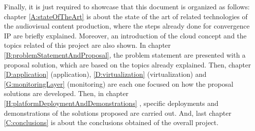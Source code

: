 Finally, it is just required to showcase that this document is organized as follows: chapter \ref{A:stateOfTheArt} is about the state of the art of related technologies of the audiovisual content production, where the steps already done for convergence IP are briefly explained. Moreover, an introduction of the cloud concept and the topics related of this project are also shown. In chapter \ref{B:problemStatementAndProposal}, the problem statement are presented with a proposal solution, which are based on the topics already explained. Then, chapter \ref{D:application} (application), \ref{D:virtualization} (virtualization) and \ref{G:monitoringLayer} (monitoring) are each one focused on how the proposal solutions are developed. Then, in chapter \ref{H:platformDeploymentAndDemonstrations}
, specific deployments and demonstrations of the solutions proposed are carried out. And, last chapter \ref{C:conclusions} is about the conclusions obtained of the overall project.





